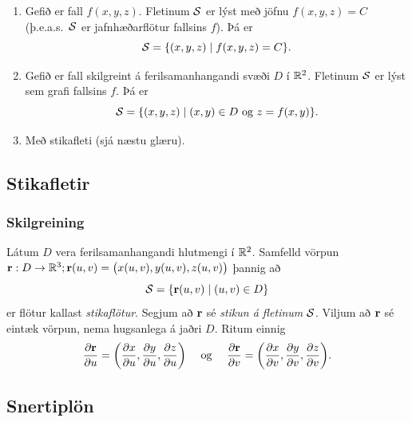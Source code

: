 \begin{enumerate}
 \item Gefið er fall $f(x,y,z)$.  Fletinum $\cal S$ er lýst með jöfnu 
$f(x,y,z)=C$ (þ.e.a.s.~$\cal S$ er jafnhæðarflötur fallsins $f$).  Þá
er
$${\cal S}=\{(x,y,z)\mid f(x,y,z)=C\}.$$

\item Gefið er fall skilgreint á ferilsamanhangandi 
svæði $D$ í ${\mathbb R}^2$.  Fletinum $\cal S$
er lýst sem grafi fallsins $f$.  Þá er
$${\cal S}=\{(x,y,z)\mid (x,y)\in D\mbox{ og } z=f(x,y)\}.$$

\item Með stikafleti (sjá næstu glæru). 
\end{enumerate}







\subsection{Stikafletir} 

\subsubsection{Skilgreining  \rtask{}}

Látum $D$ vera ferilsamanhangandi hlutmengi í ${\mathbb R}^2$.  Samfelld vörpun
$\mbox{${\bf r}$}:D\rightarrow {\mathbb R}^3; \mbox{${\bf r}$} (u,v)=\big(x(u,v), y(u,v), z(u,v)\big)$  
þannig að  
$${\cal S}=\{\mbox{${\bf r}$}(u,v)\mid (u,v)\in D\}$$
er flötur kallast {\em stikaflötur}.  Segjum að $\mbox{${\bf r}$}$ sé {\em stikun á
  fletinum} $\cal S$. 
Viljum að $\mbox{${\bf r}$}$ sé eintæk vörpun, nema hugsanlega á jaðri $D$.
Ritum einnig 
$$\frac{\partial \mbox{${\bf r}$}}{\partial u}=
\bigg(\frac{\partial x}{\partial u}, \frac{\partial y}{\partial u},
\frac{\partial z}{\partial u}\bigg)\quad\mbox{ og }\quad
\frac{\partial \mbox{${\bf r}$}}{\partial v}=
\bigg(\frac{\partial x}{\partial v}, \frac{\partial y}{\partial v},
\frac{\partial z}{\partial v}\bigg).$$





\subsection{Snertiplön} 

